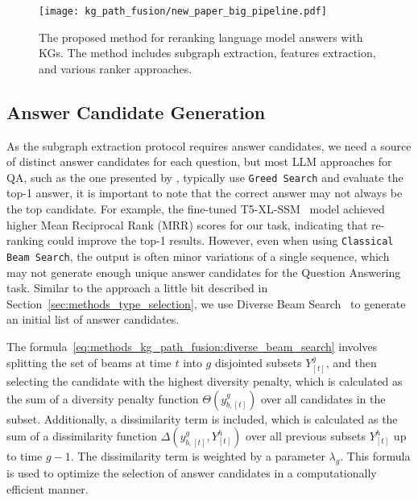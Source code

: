 \begin{figure}[htb]
    \centering
    \texttt{[image: kg\_path\_fusion/new\_paper\_big\_pipeline.pdf]}
    \caption{The proposed method for reranking language model answers with KGs. The method includes subgraph extraction, features extraction, and various ranker approaches.}
    \label{fig:methods_kg_path_fusion:big_pipe}
\end{figure}
  

\subsection{Answer Candidate Generation} \label{sec:methods_kg_path_fusion:expansion_of_generated_candidates}
As the subgraph extraction protocol requires answer candidates, we need a source of distinct answer candidates for each question, but most LLM approaches for QA, such as the one presented by \cite{DBLP:conf/coling/SenAS22-mintaka}, typically use \texttt{Greed Search} and evaluate the top-1 answer, it is important to note that the correct answer may not always be the top candidate. For example, the fine-tuned T5-XL-SSM~\cite{DBLP:conf/emnlp/RobertsRS20} model achieved higher Mean Reciprocal Rank (MRR) scores for our task, indicating that re-ranking could improve the top-1 results. 
However, even when using \texttt{Classical Beam Search}, the output is often minor variations of a single sequence, which may not generate enough unique answer candidates for the Question Answering task. Similar to the approach a little bit described in Section~\ref{sec:methods_type_selection}, we use Diverse Beam Search~\cite{DBLP:journals/corr/VijayakumarCSSL16-diverse-beam-search} to generate an initial list of answer candidates.

The formula~\ref{eq:methods_kg_path_fusion:diverse_beam_search} involves splitting the set of beams at time $t$ into $g$ disjointed subsets $Y_{[t]}^g$, and then selecting the candidate with the highest diversity penalty, which is calculated as the sum of a diversity penalty function $\Theta(y_{b,[t]}^g)$ over all candidates in the subset. Additionally, a dissimilarity term is included, which is calculated as the sum of a dissimilarity function $\Delta(y_{b,[t]}^g, Y_{[t]}^h)$ over all previous subsets $Y_{[t]}^h$ up to time $g-1$. The dissimilarity term is weighted by a parameter $\lambda_g$. This formula is used to optimize the selection of answer candidates in a computationally efficient manner.

